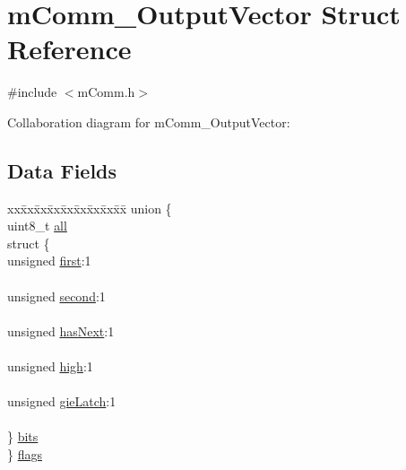 \hypertarget{structm_comm___output_vector}{}\section{m\+Comm\+\_\+\+Output\+Vector Struct Reference}
\label{structm_comm___output_vector}


{\ttfamily \#include $<$m\+Comm.\+h$>$}



Collaboration diagram for m\+Comm\+\_\+\+Output\+Vector\+:
\subsection*{Data Fields}
\begin{DoxyCompactItemize}
\item 
\begin{tabbing}
xx\=xx\=xx\=xx\=xx\=xx\=xx\=xx\=xx\=\kill
union \{\\
\>uint8\_t \hyperlink{structm_comm___output_vector_af61f8246015db4f0a85a942ac747131e}{all}\\
\>struct \{\\
\>\>unsigned \hyperlink{structm_comm___output_vector_a1672231b4c403877a69e1104ad69e006}{first}:1\\
\>\>\\
\>\>unsigned \hyperlink{structm_comm___output_vector_af7633c5cbb76481bafd5e3e1ec07ca37}{second}:1\\
\>\>\\
\>\>unsigned \hyperlink{structm_comm___output_vector_aea28f1095fd107951e1db3894ea8d03b}{hasNext}:1\\
\>\>\\
\>\>unsigned \hyperlink{structm_comm___output_vector_a529850de2db175ea613902cb8ff95ac2}{high}:1\\
\>\>\\
\>\>unsigned \hyperlink{structm_comm___output_vector_ad64db6943e903d2e5a131c1df1799aef}{gieLatch}:1\\
\>\>\\
\>\} \hyperlink{structm_comm___output_vector_a496ed1516daa851cd5ecfa9ca7f1bb54}{bits}\\
\} \hyperlink{structm_comm___output_vector_a146befb66ff5895b34928d130b1568f2}{flags}\\


\end{tabbing}
\end{DoxyCompactItemize}

